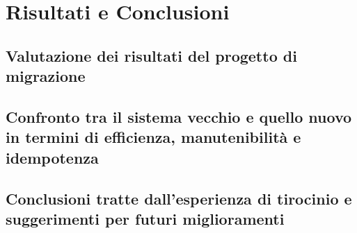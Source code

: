 \chapter{Risultati e Conclusioni}
\label{cha:conclusioni}

\section{Valutazione dei risultati del progetto di migrazione}
\label{sec:valutazione}

\lipsum[1]

\section{Confronto tra il sistema vecchio e quello nuovo in termini di
efficienza, manutenibilità e idempotenza}
\label{sec:confronto}

\lipsum[1]

\section{Conclusioni tratte dall'esperienza di tirocinio e suggerimenti per
futuri miglioramenti}
\label{sec:suggerimenti}

\lipsum[1]
